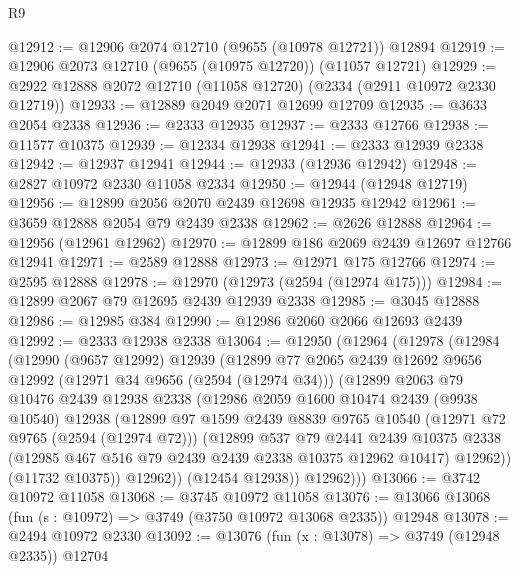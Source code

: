 \begin{lexlean}{R9}
\begin{coremodule}
@12912 := @12906 @2074 @12710 (@9655 (@10978 @12721)) @12894
@12919 := @12906 @2073 @12710 (@9655 (@10975 @12720)) (@11057 @12721)
@12929 := @2922 @12888 @2072 @12710 (@11058 @12720) (@2334 (@2911 @10972 @2330 @12719))
@12933 := @12889 @2049 @2071 @12699 @12709
@12935 := @3633 @2054 @2338
@12936 := @2333 @12935
@12937 := @2333 @12766
@12938 := @11577 @10375
@12939 := @12334 @12938
@12941 := @2333 @12939 @2338
@12942 := @12937 @12941
@12944 := @12933 (@12936 @12942)
@12948 := @2827 @10972 @2330 @11058 @2334
@12950 := @12944 (@12948 @12719)
@12956 := @12899 @2056 @2070 @2439 @12698 @12935 @12942
@12961 := @3659 @12888 @2054 @79 @2439 @2338
@12962 := @2626 @12888
@12964 := @12956 (@12961 @12962)
@12970 := @12899 @186 @2069 @2439 @12697 @12766 @12941
@12971 := @2589 @12888
@12973 := @12971 @175 @12766
@12974 := @2595 @12888
@12978 := @12970 (@12973 (@2594 (@12974 @175)))
@12984 := @12899 @2067 @79 @12695 @2439 @12939 @2338
@12985 := @3045 @12888
@12986 := @12985 @384
@12990 := @12986 @2060 @2066 @12693 @2439
@12992 := @2333 @12938 @2338
@13064 := @12950
    (@12964
      (@12978
        (@12984
          (@12990
            (@9657 @12992)
            @12939
            (@12899
              @77
              @2065
              @2439
              @12692
              @9656
              @12992
              (@12971 @34 @9656 (@2594 (@12974 @34)))
              (@12899
                @2063
                @79
                @10476
                @2439
                @12938
                @2338
                (@12986
                  @2059
                  @1600
                  @10474
                  @2439
                  (@9938 @10540)
                  @12938
                  (@12899
                    @97
                    @1599
                    @2439
                    @8839
                    @9765
                    @10540
                    (@12971 @72 @9765 (@2594 (@12974 @72)))
                    (@12899
                      @537
                      @79
                      @2441
                      @2439
                      @10375
                      @2338
                      (@12985 @467 @516 @79 @2439 @2439 @2338 @10375 @12962 @10417)
                      @12962))
                  (@11732 @10375))
                @12962))
            (@12454 @12938))
          @12962)))
@13066 := @3742 @10972 @11058
@13068 := @3745 @10972 @11058
@13076 := @13066 @13068 (fun (s : @10972) => @3749 (@3750 @10972 @13068 @2335)) @12948
@13078 := @2494 @10972 @2330
@13092 := @13076
    (fun (x : @13078) => @3749 (@12948 @2335))
    @12704

\end{coremodule}
\end{lexlean}

